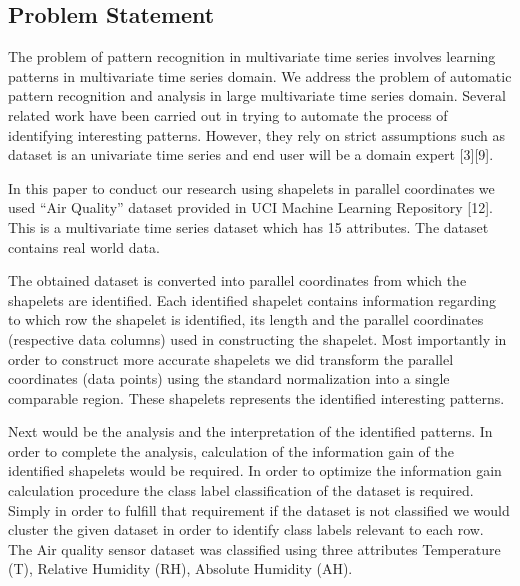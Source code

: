 \documentclass[letterpaper, 10 pt, conference]{IEEEtran}  %
\begin{document}
\subsection{Problem Statement} 
The problem of pattern recognition in multivariate time series involves learning patterns in multivariate time series domain. We address the problem of automatic pattern recognition and analysis in large multivariate time series domain. Several related work have been carried out in trying to automate the process of identifying interesting patterns. However, they rely on strict assumptions such as dataset is an univariate time series and end user will be a domain expert [3][9].

In this paper to conduct our research using shapelets in parallel coordinates we used “Air Quality” dataset provided in UCI Machine Learning Repository [12]. This is a multivariate time series dataset which has 15 attributes. The dataset contains real world data.

The obtained dataset is converted into parallel coordinates from which the shapelets are identified. Each identified shapelet contains information regarding to which row the shapelet is identified, its length and the parallel coordinates (respective data columns) used in constructing the shapelet. Most importantly in order to construct more accurate shapelets we did transform the parallel coordinates (data points) using the standard normalization into a single comparable region. These shapelets represents the identified interesting patterns.  

Next would be the analysis and the interpretation of the identified patterns. In order to complete the analysis, calculation of the information gain of the identified shapelets would be required. In order to optimize the information gain calculation procedure the class label classification of the dataset is required. Simply in order to fulfill that requirement if the dataset is not classified we would cluster the given dataset in order to identify class labels relevant to each row. The Air quality sensor dataset was classified using three attributes Temperature (T), Relative Humidity (RH), Absolute Humidity (AH). 
\end{document}
